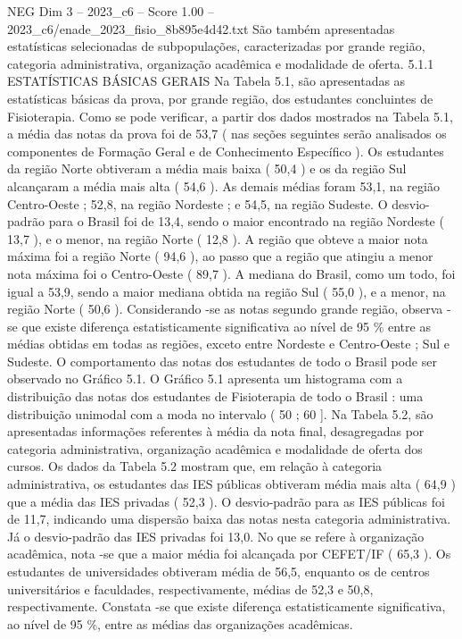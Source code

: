 \begin{textsample}{NEG Dim 3 – 2023\_c6 – Score 1.00 – 2023\_c6/enade\_2023\_fisio\_8b895e4d42.txt}
São também apresentadas estatísticas selecionadas de subpopulações, caracterizadas por grande região, categoria administrativa, organização acadêmica e modalidade de oferta. 5.1.1 ESTATÍSTICAS BÁSICAS GERAIS Na Tabela 5.1, são apresentadas as estatísticas básicas da prova, por grande região, dos estudantes concluintes de Fisioterapia.
Como se pode verificar, a partir dos dados mostrados na Tabela 5.1, a média das notas da prova foi de 53,7 ( nas seções seguintes serão analisados os componentes de Formação Geral e de Conhecimento Específico ).
Os estudantes da região Norte obtiveram a média mais baixa ( 50,4 ) e os da região Sul alcançaram a média mais alta ( 54,6 ).
As demais médias foram 53,1, na região Centro-Oeste ; 52,8, na região Nordeste ; e 54,5, na região Sudeste.
O desvio-padrão para o Brasil foi de 13,4, sendo o maior encontrado na região Nordeste ( 13,7 ), e o menor, na região Norte ( 12,8 ).
A região que obteve a maior nota máxima foi a região Norte ( 94,6 ), ao passo que a região que atingiu a menor nota máxima foi o Centro-Oeste ( 89,7 ).
A mediana do Brasil, como um todo, foi igual a 53,9, sendo a maior mediana obtida na região Sul ( 55,0 ), e a menor, na região Norte ( 50,6 ).
Considerando -se as notas segundo grande região, observa -se que existe diferença estatisticamente significativa ao nível de 95 \% entre as médias obtidas em todas as regiões, exceto entre Nordeste e Centro-Oeste ; Sul e Sudeste.
O comportamento das notas dos estudantes de todo o Brasil pode ser observado no Gráfico 5.1.
O Gráfico 5.1 apresenta um histograma com a distribuição das notas dos estudantes de Fisioterapia de todo o Brasil : uma distribuição unimodal com a moda no intervalo ( 50 ; 60 ].
Na Tabela 5.2, são apresentadas informações referentes à média da nota final, desagregadas por categoria administrativa, organização acadêmica e modalidade de oferta dos cursos.
Os dados da Tabela 5.2 mostram que, em relação à categoria administrativa, os estudantes das IES públicas obtiveram média mais alta ( 64,9 ) que a média das IES privadas ( 52,3 ).
O desvio-padrão para as IES públicas foi de 11,7, indicando uma dispersão baixa das notas nesta categoria administrativa.
Já o desvio-padrão das IES privadas foi 13,0.
No que se refere à organização acadêmica, nota -se que a maior média foi alcançada por CEFET/IF ( 65,3 ).
Os estudantes de universidades obtiveram média de 56,5, enquanto os de centros universitários e faculdades, respectivamente, médias de 52,3 e 50,8, respectivamente.
Constata -se que existe diferença estatisticamente significativa, ao nível de 95 \%, entre as médias das organizações acadêmicas.

\end{textsample}
